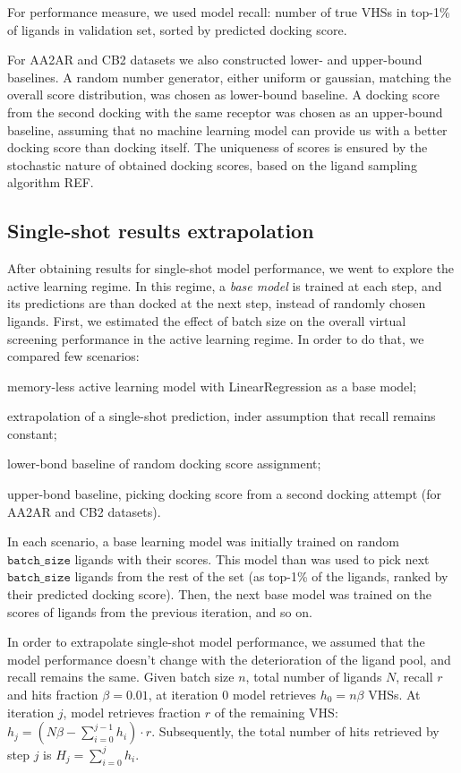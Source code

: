 For performance measure, we used model recall: number of true VHSs in top-1\% of ligands in validation set, sorted by predicted docking score.

For AA2AR and CB2 datasets we also constructed lower- and upper-bound baselines. A random number generator, either uniform or gaussian, matching the overall score distribution, was chosen as lower-bound baseline. A docking score from the second docking with the same receptor was chosen as an upper-bound baseline, assuming that no machine learning model can provide us with a better docking score than docking itself. The uniqueness of scores is ensured by the stochastic nature of obtained docking scores, based on the ligand sampling algorithm REF.

\subsection{Single-shot results extrapolation}

After obtaining results for single-shot model performance, we went to explore the active learning regime. In this regime, a \textit{base model} is trained at each step, and its predictions are than docked at the next step, instead of randomly chosen ligands. First, we estimated the effect of batch size on the overall virtual screening performance in the active learning regime. In order to do that, we compared few scenarios: 
\begin{enumerate*}[label=(\roman*)]
    \item memory-less active learning model with LinearRegression as a base model;
    \item extrapolation of a single-shot prediction, inder assumption that recall remains constant;
    \item lower-bond baseline of random docking score assignment;
    \item upper-bond baseline, picking docking score from a second docking attempt (for AA2AR and CB2 datasets).
\end{enumerate*}

In each scenario, a base learning model was initially trained on random $\texttt{batch\_size}$ ligands with their scores. This model than was used to pick next $\texttt{batch\_size}$ ligands from the rest of the set (as top-1\% of the ligands, ranked by their predicted docking score). Then, the next base model was trained on the scores of ligands from the previous iteration, and so on.

In order to extrapolate single-shot model performance, we assumed that the model performance doesn't change with the deterioration of the ligand pool, and recall remains the same. Given batch size $n$, total number of ligands $N$, recall $r$ and hits fraction $\beta=0.01$, at iteration 0 model retrieves $h_0 = n\beta$ VHSs. At iteration $j$, model retrieves fraction $r$ of the remaining VHS: $h_j = ( N\beta - \sum_{i=0}^{j-1}h_i ) \cdot r$. Subsequently, the total number of hits retrieved by step $j$ is $H_j = \sum_{i=0}^{j} h_i$.

